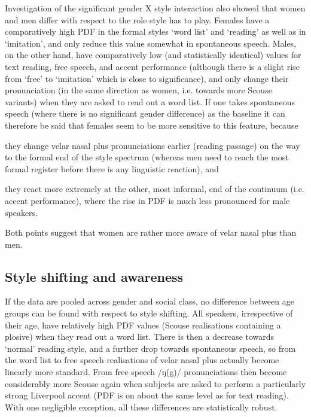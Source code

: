 Investigation of the significant gender X style interaction also showed that women and men differ with respect to the role style has to play.
Females have a comparatively high PDF in the formal styles `word list' and `reading' as well as in `imitation', and only reduce this value somewhat in spontaneous speech.
Males, on the other hand, have comparatively low (and statistically identical) values for text reading, free speech, and accent performance (although there is a slight rise from `free' to `imitation' which is close to significance), and only change their pronunciation (in the same direction as women, i.e. towards more Scouse variants) when they are asked to read out a word list.
If one takes spontaneous speech (where there is no significant gender difference) as the baseline it can therefore be said that females seem to be more sensitive to this feature, because
\begin{inparaenum}[(a)]
	\item they change velar nasal plus pronunciations earlier (reading passage) on the way to the formal end of the style spectrum (whereas men need to reach the most formal register before there is any linguistic reaction), and
	\item they react more extremely at the other, most informal, end of the continuum (i.e. accent performance), where the rise in PDF is much less pronounced for male speakers.
\end{inparaenum}
Both points suggest that women are rather more aware of velar nasal plus than men.

\subsection{Style shifting and awareness}
\label{prod.disc.ng.style}

If the data are pooled across gender and social class, no difference between age groups can be found with respect to style shifting.
All speakers, irrespective of their age, have relatively high PDF values (Scouse realisations containing a plosive) when they read out a word list.
There is then a decrease towards `normal' reading style, and a further drop towards spontaneous speech, so from the word list to free speech realisations of velar nasal plus actually become linearly more standard.
From free speech /ŋ(g)/ pronunciations then become considerably more Scouse again when subjects are asked to perform a particularly strong Liverpool accent (PDF is on about the same level as for text reading).
With one negligible exception, all these differences are statistically robust.

